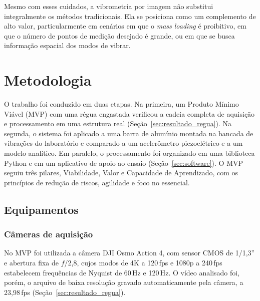 \documentclass[a4paper,10pt,twocolumn]{article}
\begin{document}
Mesmo com esses cuidados, a vibrometria por imagem não substitui integralmente os métodos tradicionais. Ela se posiciona como um complemento de alto valor, particularmente em cenários em que o \textit{mass loading} é proibitivo, em que o número de pontos de medição desejado é grande, ou em que se busca informação espacial dos modos de vibrar.

\section{Metodologia}

O trabalho foi conduzido em duas etapas. Na primeira, um Produto Mínimo Viável (MVP) com uma régua engastada verificou a cadeia completa de aquisição e processamento em uma estrutura real (Seção~\ref{sec:resultado_regua}). Na segunda, o sistema foi aplicado a uma barra de alumínio montada na bancada de vibrações do laboratório e comparado a um acelerômetro piezoelétrico e a um modelo analítico. Em paralelo, o processamento foi organizado em uma biblioteca Python e em um aplicativo de apoio ao ensaio (Seção~\ref{sec:software}). O MVP seguiu três pilares, Viabilidade, Valor e Capacidade de Aprendizado, com os princípios de redução de riscos, agilidade e foco no essencial.

\subsection{Equipamentos}
\label{sec:equipamentos}

\subsubsection{Câmeras de aquisição}
\label{sec:equipamentos_camera}
\label{sec:camera}

No MVP foi utilizada a câmera DJI Osmo Action 4, com sensor CMOS de 1/1{,}3'' e abertura fixa de $f$/2{,}8, cujos modos de 4K a 120\,fps e 1080p a 240\,fps estabelecem frequências de Nyquist de 60\,Hz e 120\,Hz. O vídeo analisado foi, porém, o arquivo de baixa resolução gravado automaticamente pela câmera, a 23,98\,fps (Seção~\ref{sec:resultado_regua}).
\end{document}

